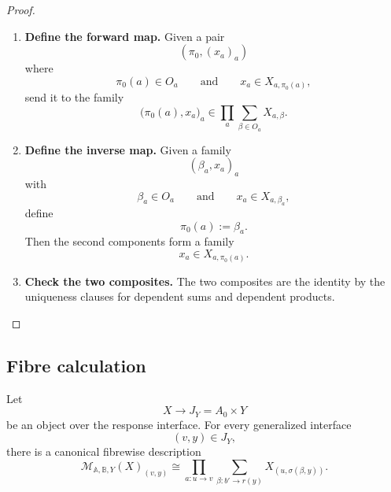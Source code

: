 \begin{proof}
\leavevmode
\begin{enumerate}
\item \textbf{Define the forward map.}
Given a pair
\[
(\pi_0,(x_a)_a)
\]
where
\[
\pi_0(a)\in O_a
\qquad\text{and}\qquad
x_a\in X_{a,\pi_0(a)},
\]
send it to the family
\[
\bigl(\pi_0(a),x_a\bigr)_a
\in
\prod_a\sum_{\beta\in O_a}X_{a,\beta}.
\]

\item \textbf{Define the inverse map.}
Given a family
\[
(\beta_a,x_a)_a
\]
with
\[
\beta_a\in O_a
\qquad\text{and}\qquad
x_a\in X_{a,\beta_a},
\]
define
\[
\pi_0(a):=\beta_a.
\]
Then the second components form a family
\[
x_a\in X_{a,\pi_0(a)}.
\]

\item \textbf{Check the two composites.}
The two composites are the identity by the uniqueness clauses for dependent
sums and dependent products.
\end{enumerate}
\end{proof}

\subsection{Fibre calculation}
\label{subsec:poly-relative-fibre-calculation}

\begin{proposition}
\label{prop:poly-relative-fibre-calculation}
Let
\[
X\to J_Y=A_0\times Y
\]
be an object over the response interface.  For every generalized interface
\[
(v,y)\in J_Y,
\]
there is a canonical fibrewise description
\[
\mathcal M_{\mathbb A,\mathbb B,Y}(X)_{(v,y)}
\cong
\prod_{a:u\to v}
\sum_{\beta:b'\to r(y)}
X_{(u,\sigma(\beta,y))}.
\]
\end{proposition}


